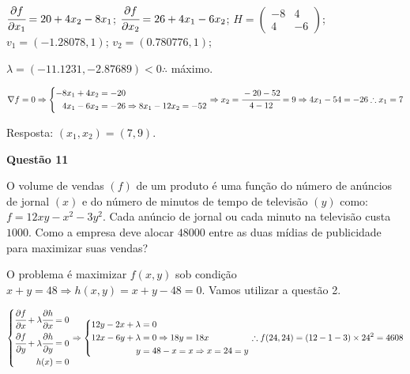 \documentclass{rbfin}
\begin{document}
\vspace{3mm}

$\cfrac{\partial f}{\partial x_1} = 20 + 4x_2 - 8x_1$; $\cfrac{\partial f}{\partial x_2} = 26 + 4x_1 - 6x_2$; $H = \begin{pmatrix} -8 & 4 \\ 4 & -6 \end{pmatrix}$; $v_1 = (-1.28078, 1)$; $v_2 = (0.780776, 1)$; 

$\lambda = (-11.1231, -2.87689) < 0 \therefore$ máximo.

\begin{equation*}
	\nabla f = 0 \Rightarrow \left\{\begin{aligned}
- 8x_1 + 4x_2 &= -20 \\
 4x_1 - 6x_2 &= -26 \Rightarrow 8 x_1 - 12x_2 = - 52
	\end{aligned} \right. \Rightarrow x_2 = \cfrac{- 20 - 52}{4 - 12} = 9 \Rightarrow 4x_1 - 54 = -26 \therefore x_1 = 7
\end{equation*}

\vspace{6mm}

Resposta: $(x_1, x_2) = (7,9)$.

\vspace{6mm}

\large

\textbf{Questão 11}

\normalsize

\vspace{6mm}

O volume de vendas $(f)$ de um produto é uma função do número de anúncios de
jornal $(x)$ e do número de minutos de tempo de televisão $(y)$ como: $f = 12xy - x^2 - 3y^2$.
Cada anúncio de jornal ou cada minuto na televisão custa $1000$. Como a empresa
deve alocar $48000$ entre as duas mídias de publicidade para maximizar suas
vendas?

\vspace{3mm}

O problema é maximizar $f(x,y)$ sob condição $x + y = 48 \Rightarrow h(x,y) = x + y - 48 = 0$. Vamos utilizar a questão 2.

\begin{equation*}
\left\{\begin{aligned}
\cfrac{\partial f}{\partial x} + \lambda \cfrac{\partial h}{\partial x} &= 0 \\
\cfrac{\partial f}{\partial y} + \lambda \cfrac{\partial h}{\partial y} &= 0 \\
h(x) &= 0 
	\end{aligned} \right. \Rightarrow 
\left\{\begin{aligned}
12y - 2x + \lambda &= 0 \\
12x - 6y + \lambda &= 0 \Rightarrow 18y = 18x \\
y &= 48 - x = x \Rightarrow x = 24 = y
	\end{aligned} \right. \therefore f(24,24) = (12 - 1 - 3)\times 24^2 = 4608
\end{equation*}
\end{document}
